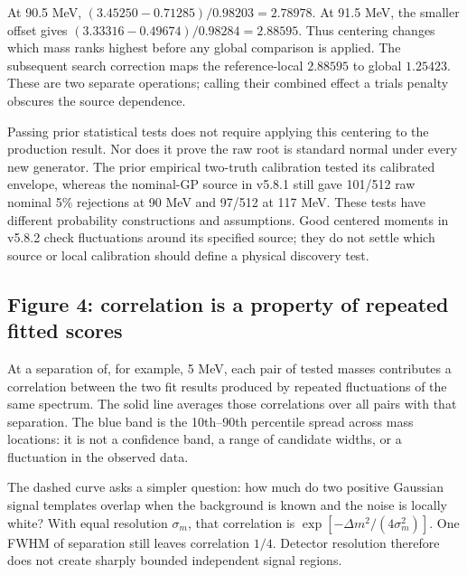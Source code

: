 At 90.5 MeV, $(3.45250-0.71285)/0.98203=2.78978$. At 91.5 MeV, the smaller offset gives $(3.33316-0.49674)/0.98284=2.88595$. Thus centering changes which mass ranks highest before any global comparison is applied. The subsequent search correction maps the reference-local $2.88595$ to global $1.25423$. These are two separate operations; calling their combined effect a trials penalty obscures the source dependence.

Passing prior statistical tests does not require applying this centering to the production result. Nor does it prove the raw root is standard normal under every new generator. The prior empirical two-truth calibration tested its calibrated envelope, whereas the nominal-GP source in v5.8.1 still gave 101/512 raw nominal 5\% rejections at 90 MeV and 97/512 at 117 MeV. These tests have different probability constructions and assumptions. Good centered moments in v5.8.2 check fluctuations around its specified source; they do not settle which source or local calibration should define a physical discovery test.

\subsection{Figure 4: correlation is a property of repeated fitted scores}
At a separation of, for example, 5 MeV, each pair of tested masses contributes a correlation between the two fit results produced by repeated fluctuations of the same spectrum. The solid line averages those correlations over all pairs with that separation. The blue band is the 10th--90th percentile spread across mass locations: it is not a confidence band, a range of candidate widths, or a fluctuation in the observed data.

The dashed curve asks a simpler question: how much do two positive Gaussian signal templates overlap when the background is known and the noise is locally white? With equal resolution $\sigma_m$, that correlation is $\exp[-\Delta m^2/(4\sigma_m^2)]$. One FWHM of separation still leaves correlation $1/4$. Detector resolution therefore does not create sharply bounded independent signal regions.


